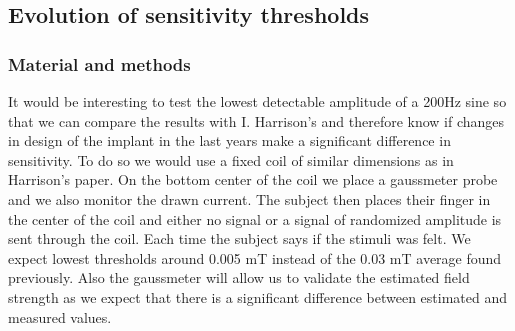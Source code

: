 \documentclass[10pt,journal,compsoc]{IEEEtran}
\begin{document}
%


\subsection{Evolution of sensitivity thresholds}
\subsubsection{Material and methods}
It would be interesting to test the lowest detectable amplitude of a 200Hz sine so that we can compare the results with \cite{harrison2018tf} I. Harrison's and therefore know if changes in design of the implant in the last years make a significant difference in sensitivity. To do so we would use a fixed coil of similar dimensions as in \cite{harrison2018tf} Harrison's paper. On the bottom center of the coil we place a gaussmeter probe and we also monitor the drawn current. The subject then places their finger in the center of the coil and either no signal or a signal of randomized amplitude is sent through the coil. Each time the subject says if the stimuli was felt.
We expect lowest thresholds around 0.005 mT instead of the 0.03 mT average found previously. Also the gaussmeter will allow us to validate the estimated field strength as we expect that there is a significant difference between estimated and measured values.
\end{document}
